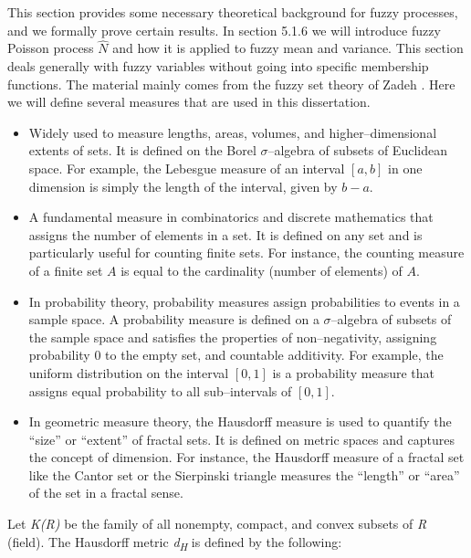 \documentclass[12pt,a4paper]{report}
\numberwithin{equation}{section}
\begin{document}
This section provides some necessary theoretical background for fuzzy
processes, and we formally prove certain results. In section 5.1.6 we
will introduce fuzzy Poisson process \emph{$\hat{N}$} and how it is applied to
fuzzy mean and variance. This section deals generally with fuzzy
variables without going into specific membership functions. The material
mainly comes from the fuzzy set theory of Zadeh \cite{zadeh1965fuzzy_66}. Here we will
define several measures that are used in this dissertation. 
\begin{itemize}
    \item {} Widely used to measure lengths, areas, volumes, and higher--dimensional extents of sets. It is defined on the Borel $\sigma$--algebra of subsets of Euclidean space. For example, the Lebesgue measure of an interval $[a, b]$ in one dimension is simply the length of the interval, given by $b - a$.

    \item {} A fundamental measure in combinatorics and discrete mathematics that assigns the number of elements in a set. It is defined on any set and is particularly useful for counting finite sets. For instance, the counting measure of a finite set $A$ is equal to the cardinality (number of elements) of $A$.

    \item {} In probability theory, probability measures assign probabilities to events in a sample space. A probability measure is defined on a $\sigma$--algebra of subsets of the sample space and satisfies the properties of non--negativity, assigning probability 0 to the empty set, and countable additivity. For example, the uniform distribution on the interval $[0, 1]$ is a probability measure that assigns equal probability to all sub--intervals of $[0, 1]$.

    \item {} In geometric measure theory, the Hausdorff measure is used to quantify the ``size'' or ``extent'' of fractal sets. It is defined on metric spaces and captures the concept of dimension. For instance, the Hausdorff measure of a fractal set like the Cantor set or the Sierpinski triangle measures the ``length'' or ``area'' of the set in a fractal sense.
\end{itemize}

Let \emph{K(R)} be the family of all nonempty, compact, and convex
subsets of \emph{R} (field). The Hausdorff metric
\emph{d\textsubscript{H}} is defined by the following:
\end{document}
